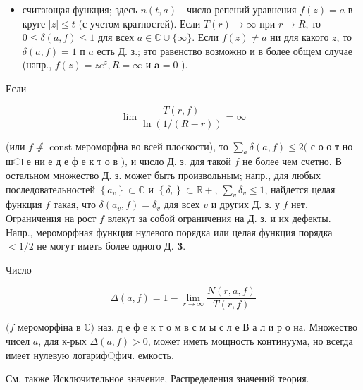 \documentclass[10pt]{article}
\begin{document}
\begin{itemize}

  \item считающая функция; здесь $n(t, a)$ - число репений уравнения $f(z)=a$ в круге $|z| \leqslant t$ (с учетом кратностей). Если $T(r) \rightarrow \infty$ при $r \rightarrow R$, то $0 \leqslant \delta(a, f) \leqslant 1$ для всех $a \in \mathbb{C} \cup\{\infty\}$. Если $f(z) \neq a$ ни для какого $z$, то $\delta(a, f)=1$ п $a$ есть Д. з.; это равенство возможно и в более общем случае (напр., $f(z)=z e^{z}, R=\infty$ и $\boldsymbol{a}=0$ ).

\end{itemize}



Если



\[

\overline{\lim } \frac{T(r, f)}{\ln (1 /(R-r))}=\infty

\]



(или $f \not \neq$ const мероморфна во всей плоскости), то $\sum_{a} \delta(a, f) \leqslant 2($ с о о т но шा е ни е д е ф е к т о в $)$, и число Д. з. для такой $f$ не более чем счетно. В остальном множество Д. з. может быть произвольным; напр., для любых последовательностей $\left\{a_{v}\right\} \subset \mathbb{C}$ и $\left\{\delta_{v}\right\} \subset \mathbb{R}+$, $\sum_{v} \delta_{v} \leqslant 1$, найдется целая функция $f$ такая, что $\delta\left(a_{v}, f\right)=\delta_{v}$ для всех $v$ и других Д. з. у $f$ нет. Ограничения на рост $f$ влекут за собой ограничения на Д. з. и их дефекты. Напр., мероморфная функция нулевого порядка или целая функция порядка $<1 / 2$ не могут иметь более одного Д. $\mathbf{3}$.



Число



\[

\Delta(a, f)=1-\lim _{r \rightarrow \infty} \frac{N(r, a, f)}{T(r, f)}

\]



$(f$ мероморфіна в $\mathbb{C})$ наз. д е ф е к т о м в с м ы с л е В а л и р о на. Множество чисел $a$, для к-рых $\Delta(a, f)>0$, может иметь мощность континуума, но всегда имеет нулевую логариф্фич. емкость.



См. также Исключительное значение, Распределения значений теория.
\end{document}
